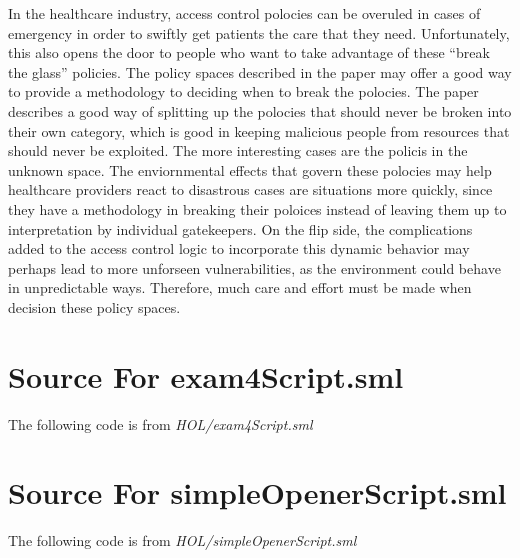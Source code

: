 \documentclass[11pt, twoside]{article}
\begin{document}
In the healthcare industry, access control polocies can be overuled in cases of emergency in order
to swiftly get patients the care that they need. Unfortunately, this also opens the door to people
who want to take advantage of these ``break the glass'' policies. The policy spaces described in the paper
may offer a good way to provide a methodology to deciding when to break the polocies. The paper describes a good
way of splitting up the polocies that should never be broken into their own category, which is good in keeping malicious
people from resources that should never be exploited. The more interesting cases are the policis in the unknown space. The enviornmental 
effects that govern these polocies may help healthcare providers react to disastrous cases are situations more quickly, since they 
have a methodology in breaking their poloices instead of leaving them up to interpretation by individual gatekeepers. On the flip side, the 
complications added to the access control logic to incorporate this dynamic behavior may perhaps lead to more unforseen vulnerabilities,
as the environment could behave in unpredictable ways. Therefore, much care and effort must be made when decision these policy spaces. 


\HOLindex

\appendix{}

\section{Source For exam4Script.sml}
\label{sec:source-exam4scr}

The following code is from \emph{HOL/exam4Script.sml}


\section{Source For simpleOpenerScript.sml}
\label{sec:source-simpl}

The following code is from \emph{HOL/simpleOpenerScript.sml}

\end{document}
